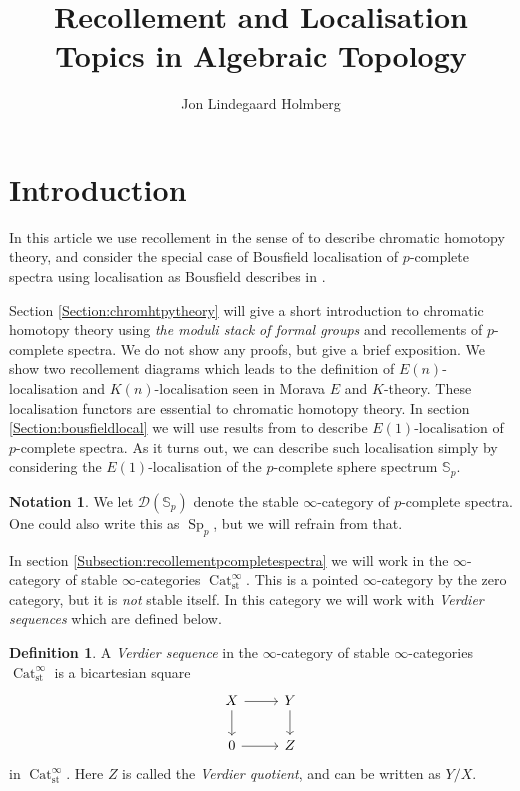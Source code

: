 \documentclass[a4paper]{article} %
\author{Jon Lindegaard Holmberg}
\title{Recollement and Localisation\\Topics in Algebraic Topology}
\theoremstyle{definition}
\newtheorem{definition}[theorem]{Definition}
\newtheorem*{notation}{Notation}
\newcommand{\Sph}{\mathbb{S}}
\DeclareMathOperator{\Cat}{Cat}         %
\begin{document}
\maketitle

\tableofcontents

\section{Introduction}
In this article we use recollement in the sense of \cite{barwickglasman} to describe chromatic homotopy theory, and consider the special case of Bousfield localisation of $p$-complete spectra using localisation as Bousfield describes in \cite{bousfield1979localization}.

Section \ref{Section:chromhtpytheory} will give a short introduction to chromatic homotopy theory using \textit{the moduli stack of formal groups} and recollements of $p$-complete spectra. We do not show any proofs, but give a brief exposition. We show two recollement diagrams which leads to the definition of $E(n)$-localisation and $K(n)$-localisation seen in Morava $E$ and $K$-theory. These localisation functors are essential to chromatic homotopy theory. In section \ref{Section:bousfieldlocal} we will use results from \cite{bousfield1979localization}
to describe $E(1)$-localisation of $p$-complete spectra. As it turns out, we can describe such localisation simply by considering the $E(1)$-localisation of the $p$-complete sphere spectrum $\Sph_p$.
\begin{notation}
  We let $\mathcal{D} (\Sph_p)$ denote the stable $\infty$-category of $p$-complete spectra. One could also write this as $\operatorname{Sp}_p$, but we will refrain from that.
\end{notation}
In section \ref{Subsection:recollementpcompletespectra} we will work in the $\infty$-category of stable $\infty$-categories $\Cat_{\text{st}}^\infty$. This is a pointed $\infty$-category by the zero category, but it is \textit{not} stable itself. In this category we will work with \textit{Verdier sequences} which are defined below.

\begin{definition}
  A \textit{Verdier sequence} in the $\infty$-category of stable $\infty$-categories $\Cat_{\text{st}}^\infty$ is a bicartesian square
  \[
    \begin{tikzcd}
      X \arrow{r}{} \arrow{d}{} & Y \arrow{d}{} \\
       0 \arrow{r}{} & Z
    \end{tikzcd}
  \]
  in $\Cat_{\text{st}}^\infty$. Here $Z$ is called the \textit{Verdier quotient}, and can be written as $Y/X$.
\end{definition}
\end{document}
